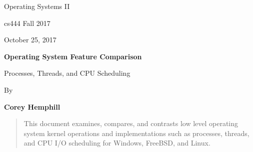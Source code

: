 \documentclass[letterpaper,10pt,draftclsnofoot,onecolumn]{IEEEtran}
\def \Author{Corey Hemphill}
\def \Title{Operating System Feature Comparison}
\def \Subtitle{Processes, Threads, and CPU Scheduling}
\def \Term{cs444 Fall 2017}
\def \DueDate{October 25, 2017}
\def \DocType{
	Operating Systems II
}
\begin{document}
\begin{titlepage}
    \begin{singlespace}
        \hfill  
        \par\vspace{.2in}
        \centering
        \scshape{
            \huge  \DocType \par
           	\huge \Term \par
            {\large \DueDate}\par
            \vspace{.5in}
            \textbf{\Huge \Title}\par
            {\large \Subtitle}\par
            \vspace{.5in}
           
            {\large By }\par
           	\textbf{\Author}\par
   
            \vspace{5pt}
            }
            \vspace{120pt}
        
        \begin{abstract}
        This document examines, compares, and contrasts low level operating system kernel operations and implementations such as processes, threads, and CPU I/O scheduling for Windows, FreeBSD, and Linux.
        \end{abstract} 
        
    \end{singlespace}
\end{titlepage}
\newpage
\end{document}
